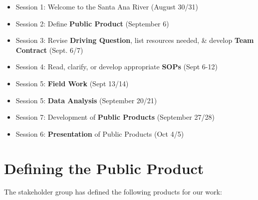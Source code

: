 \documentclass{tufte-handout}\usepackage[]{graphicx}\usepackage[]{color}
\begin{document}
\begin{itemize}
  \item Session 1: Welcome to the Santa Ana River (August 30/31)
  \item Session 2: Define \textbf{Public Product} (September 6)  
  \item Session 3: Revise \textbf{Driving Question}, list resources needed,  \& develop \textbf{Team Contract} (Sept. 6/7)
  \item Session 4: Read, clarify, or develop appropriate \textbf{SOPs} (Sept 6-12)
  \item Session 5: \textbf{Field Work} (Sept 13/14)
  \item Session 5: \textbf{Data Analysis} (September 20/21)
  \item Session 7: Development of \textbf{Public Products} (September 27/28)
  \item Session 6: \textbf{Presentation} of Public Products (Oct 4/5)
\end{itemize}

\section{Defining the Public Product}

The stakeholder group has defined the following products for our work:
\end{document}
